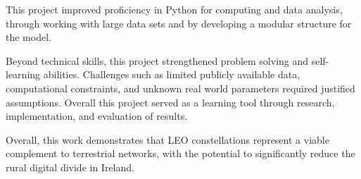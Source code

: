 This project improved proficiency in Python for computing and data analysis, through working with large data sets and by developing a modular structure for the model. 

Beyond technical skills, this project strengthened problem solving and self-learning abilities. Challenges such as limited publicly available data, computational constraints, and unknown real world parameters required justified assumptions. Overall this project served as a learning tool through research, implementation, and evaluation of results. 

Overall, this work demonstrates that LEO constellations represent a viable complement to terrestrial networks, with the potential to significantly reduce the rural digital divide in Ireland.
